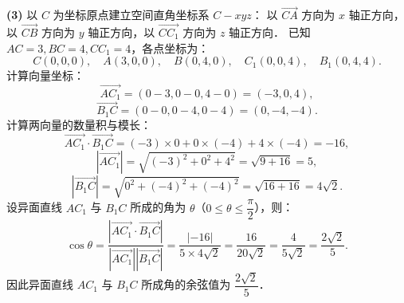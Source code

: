 \begin{answer}
\textbf{(3)}
以 $C$ 为坐标原点建立空间直角坐标系 $C - xyz$：
以 $\overrightarrow{CA}$ 方向为 $x$ 轴正方向，以 $\overrightarrow{CB}$ 方向为 $y$ 轴正方向，以 $\overrightarrow{CC_1}$ 方向为 $z$ 轴正方向．
已知 $AC = 3, BC = 4, CC_1 = 4$，各点坐标为：
\nopagebreak[4]
\[
C(0, 0, 0), \quad A(3, 0, 0), \quad B(0, 4, 0), \quad C_1(0, 0, 4), \quad B_1(0, 4, 4).
\]
计算向量坐标：
\nopagebreak[4]
\[
\overrightarrow{AC_1} = (0 - 3, 0 - 0, 4 - 0) = (-3, 0, 4),
\]
\nopagebreak[4]
\[
\overrightarrow{B_1C} = (0 - 0, 0 - 4, 0 - 4) = (0, -4, -4).
\]
计算两向量的数量积与模长：
\nopagebreak[4]
\[
\overrightarrow{AC_1} \cdot \overrightarrow{B_1C} = (-3) \times 0 + 0 \times (-4) + 4 \times (-4) = -16,
\]
\nopagebreak[4]
\[
|\overrightarrow{AC_1}| = \sqrt{(-3)^2 + 0^2 + 4^2} = \sqrt{9 + 16} = 5,
\]
\nopagebreak[4]
\[
|\overrightarrow{B_1C}| = \sqrt{0^2 + (-4)^2 + (-4)^2} = \sqrt{16 + 16} = 4\sqrt{2}.
\]
设异面直线 $AC_1$ 与 $B_1C$ 所成的角为 $\theta$（$0 \leqslant \theta \leqslant \dfrac{\pi}{2}$），则：
\nopagebreak[4]
\[
\cos\theta = \frac{|\overrightarrow{AC_1} \cdot \overrightarrow{B_1C}|}{|\overrightarrow{AC_1}| |\overrightarrow{B_1C}|} = \frac{|-16|}{5 \times 4\sqrt{2}} = \frac{16}{20\sqrt{2}} = \frac{4}{5\sqrt{2}} = \frac{2\sqrt{2}}{5}.
\]
因此异面直线 $AC_1$ 与 $B_1C$ 所成角的余弦值为 $\dfrac{2\sqrt{2}}{5}$．




\end{answer}
